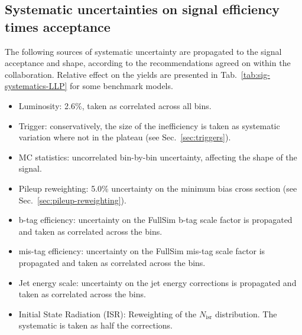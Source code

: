 \subsection{Systematic uncertainties on signal efficiency times acceptance}
\label{sec:sig-syst-LLP}

The following sources of systematic uncertainty are propagated to the
signal acceptance and shape, according to the recommendations agreed
on within the collaboration. Relative effect on the yields are
presented in Tab.~\ref{tab:sig-systematics-LLP} for some benchmark
models.

\begin{itemize}
    \item Luminosity: 2.6\%, taken as correlated across all bins.
    \item Trigger: conservatively, the size of the inefficiency is taken as
        systematic variation where not in the plateau (see Sec.~\ref{sec:triggers}).
    \item MC statistics:  uncorrelated bin-by-bin uncertainty, affecting the
        shape of the signal.
    \item Pileup reweighting: 5.0\% uncertainty on the minimum bias cross section
        (see Sec.~\ref{sec:pileup-reweighting}).
    \item b-tag efficiency: uncertainty on the FullSim b-tag scale
        factor is propagated and taken as correlated across the bins.
    \item mis-tag efficiency: uncertainty on the FullSim mis-tag scale
        factor is propagated and taken as correlated across the bins.
    \item Jet energy scale: uncertainty on the jet energy corrections is
        propagated and taken as correlated across the bins.
    \item Initial State Radiation (ISR): Reweighting of the $N_{\text{isr}}$
        distribution. The systematic is taken as half the corrections.
\end{itemize}

